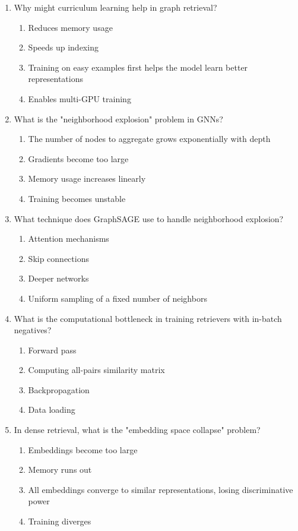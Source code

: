 \documentclass[12pt,a4paper]{article}
\begin{document}
\begin{enumerate}
\item Why might curriculum learning help in graph retrieval?
\begin{enumerate}[label=\Alph*)]
    \item Reduces memory usage
    \item Speeds up indexing
    \item Training on easy examples first helps the model learn better representations
    \item Enables multi-GPU training
\end{enumerate}

\item What is the "neighborhood explosion" problem in GNNs?
\begin{enumerate}[label=\Alph*)]
    \item The number of nodes to aggregate grows exponentially with depth
    \item Gradients become too large
    \item Memory usage increases linearly
    \item Training becomes unstable
\end{enumerate}

\item What technique does GraphSAGE use to handle neighborhood explosion?
\begin{enumerate}[label=\Alph*)]
    \item Attention mechanisms
    \item Skip connections
    \item Deeper networks
    \item Uniform sampling of a fixed number of neighbors
\end{enumerate}

\item What is the computational bottleneck in training retrievers with in-batch negatives?
\begin{enumerate}[label=\Alph*)]
    \item Forward pass
    \item Computing all-pairs similarity matrix
    \item Backpropagation
    \item Data loading
\end{enumerate}

\item In dense retrieval, what is the "embedding space collapse" problem?
\begin{enumerate}[label=\Alph*)]
    \item Embeddings become too large
    \item Memory runs out
    \item All embeddings converge to similar representations, losing discriminative power
    \item Training diverges
\end{enumerate}


\end{enumerate}
\end{document}
